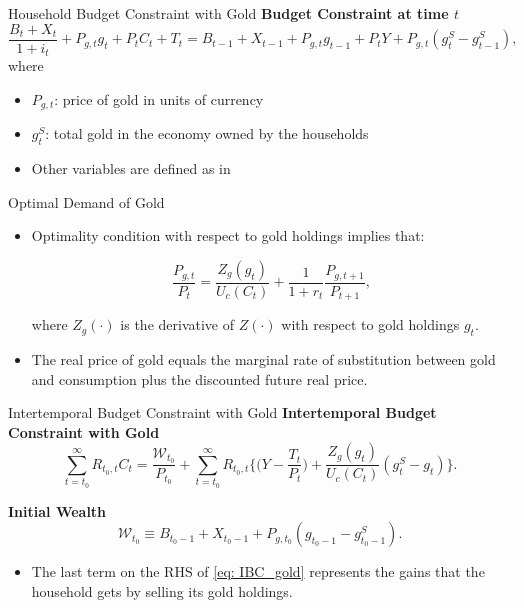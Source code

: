\documentclass[11pt,aspectratio=169]{beamer}
\begin{document}
\begin{frame}{Household Budget Constraint with Gold}
\textbf{Budget Constraint at time $t$}
\begin{equation} \label{eq: budget_gold}
\frac{B_t + X_t}{1+i_t} + P_{g,t} g_t + P_t C_t + T_t
= B_{t-1} + X_{t-1} + P_{g,t} g_{t-1} + P_t Y + P_{g,t} (g_t^S - g_{t-1}^S),
\end{equation}
\vspace{0.2cm}
where
\begin{itemize}
  \item $P_{g,t}$: price of gold in units of currency
  \item $g_t^S$: total gold in the economy owned by the households
  \item Other variables are defined as in \hyperlink{orig_budget}{}
\end{itemize}
\end{frame}

\begin{frame}{Optimal Demand of Gold}
\begin{itemize}
  \item Optimality condition with respect to gold holdings implies that:

\begin{equation} \label{eq: FOC_gold}
\frac{P_{g,t}}{P_t} = \frac{Z_g(g_t)}{U_c(C_t)} + \frac{1}{1+r_t} \frac{P_{g,t+1}}{P_{t+1}},
\end{equation}

where $Z_g(\cdot)$ is the derivative of $Z(\cdot)$ with respect to gold holdings $g_t$.
\vspace{0.3cm}
  \item The real price of gold equals the marginal rate of substitution between gold and consumption plus the discounted future real price.
\end{itemize}
\end{frame}

\begin{frame}{Intertemporal Budget Constraint with Gold}
\textbf{Intertemporal Budget Constraint with Gold}
\begin{equation} \label{eq: IBC_gold}
\sum_{t=t_0}^{\infty} R_{t_0,t} C_t = \frac{\mathcal{W}_{t_0}}{P_{t_0}} + 
\sum_{t=t_0}^{\infty} R_{t_0,t} \Bigg\{ \Big(Y - \frac{T_t}{P_t}\Big) + \frac{Z_g(g_t)}{U_c(C_t)} (g_t^S - g_t) \Bigg\}.
\end{equation}
\vspace{0.15cm}

\textbf{Initial Wealth}
\begin{equation}
\mathcal{W}_{t_0} \equiv B_{t_0-1} + X_{t_0-1} + P_{g,t_0} (g_{t_0-1} - g_{t_0-1}^S).
\end{equation}
\vspace{0.3cm}
\begin{itemize}
    \item The last term on the RHS of \eqref{eq: IBC_gold} represents the gains that the household gets by selling its gold holdings.
\end{itemize}
\end{frame}
\end{document}
